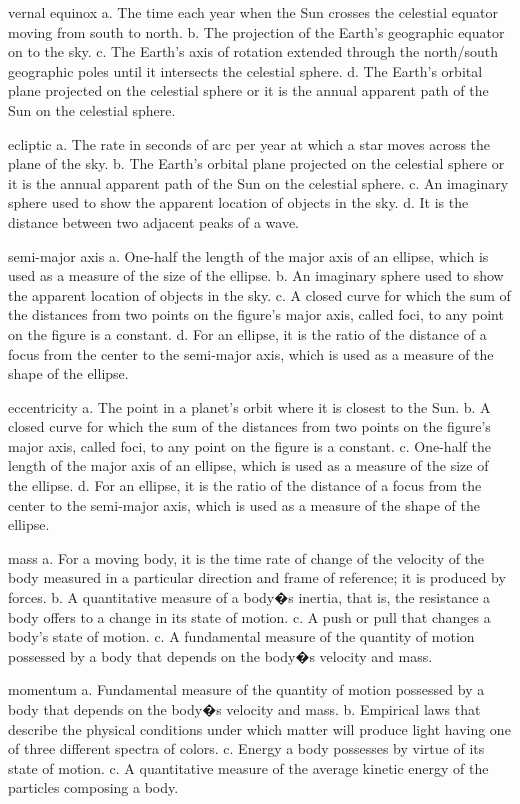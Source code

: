    vernal equinox
    a. The time each year when the Sun crosses the celestial equator moving from south to north.
    b. The projection of the Earth's geographic equator on to the sky.
    c. The Earth's axis of rotation extended through the north/south geographic poles until it intersects the celestial sphere.
    d. The Earth's orbital plane projected on the celestial sphere or it is the annual apparent path of the Sun on the celestial sphere.

    ecliptic
    a. The rate in seconds of arc per year at which a star moves across the plane of the sky.
    b. The Earth's orbital plane projected on the celestial sphere or it is the annual apparent path of the Sun on the celestial sphere.
    c. An imaginary sphere used to show the apparent location of objects in the sky.
    d. It is the distance between two adjacent peaks of a wave.

    semi-major axis
    a. One-half the length of the major axis of an ellipse, which is used as a measure of the size of the ellipse.
    b. An imaginary sphere used to show the apparent location of objects in the sky.
    c. A closed curve for which the sum of the distances from two points on the figure's major axis, called foci, to any point on the figure is a constant.
    d. For an ellipse, it is the ratio of the distance of a focus from the center to the semi-major axis, which is used as a measure of the shape of the ellipse.

    eccentricity
    a. The point in a planet's orbit where it is closest to the Sun.
    b. A closed curve for which the sum of the distances from two points on the figure's major axis, called foci, to any point on the figure is a constant.
    c. One-half the length of the major axis of an ellipse, which is used as a measure of the size of the ellipse.
    d. For an ellipse, it is the ratio of the distance of a focus from the center to the semi-major axis, which is used as a measure of the shape of the ellipse.

    mass
    a. For a moving body, it is the time rate of change of the velocity of the body measured in a particular direction and frame of reference; it is produced by forces.
    b. A quantitative measure of a body�s inertia, that is, the resistance a body offers to a change in its state of motion.
    c. A push or pull that changes a body's state of motion.
    c. A fundamental measure of the quantity of motion possessed by a body that depends on the body�s velocity and mass.

    momentum
    a. Fundamental measure of the quantity of motion possessed by a body that depends on the body�s velocity and mass.
    b. Empirical laws that describe the physical conditions under which matter will produce light having one of three different spectra of colors.
    c. Energy a body possesses by virtue of its state of motion.
    c. A quantitative measure of the average kinetic energy of the particles composing a body.

